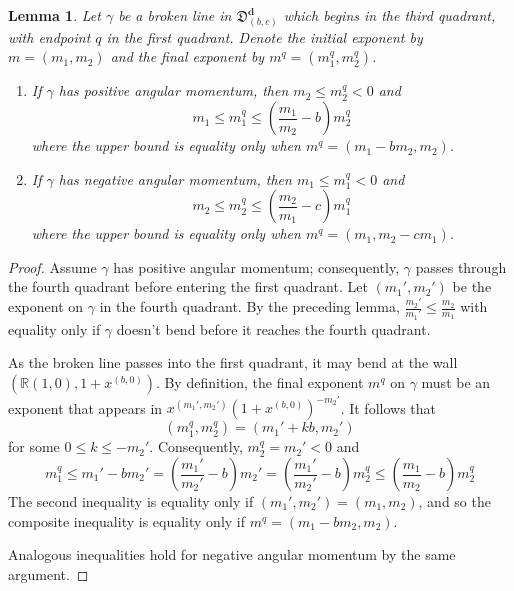 \documentclass[11pt]{amsart}
\newtheorem{lemma}{Lemma}[section]
\theoremstyle{remark}
\numberwithin{equation}{section}
\begin{document}
\begin{lemma}
Let $\gamma$ be a broken line in $\mathfrak{D}_{(b,c)}^{\mathbf{d}}$ which begins in the third quadrant, with endpoint $q$ in the first quadrant.  Denote the  initial exponent by $m=(m_1,m_2)$ and the final exponent by $m^q=(m_1^q,m_2^q)$.  
\begin{enumerate}
  \item If $\gamma$ has positive angular momentum, then $m_2\leq m_2^q<0$ and
  \[ m_1\leq m_1^q\leq\left( \frac{m_1}{m_2}-b\right)m_2^q\]
  where the upper bound is equality only when $m^q =( m_1-bm_2,m_2)$.
  \item If $\gamma$ has negative angular momentum, then $m_1\leq  m_1^q<0$ and
  \[ m_2 \leq m_2^q\leq\left( \frac{m_2}{m_1}-c\right)m_1^q\]
  where the upper bound is equality only when $m^q =( m_1,m_2-cm_1)$.
\end{enumerate}
\end{lemma}
\begin{proof}
Assume $\gamma$ has positive angular momentum; consequently, $\gamma$ passes through the fourth quadrant before entering the first quadrant.  Let $(m_1',m_2')$ be the exponent on $\gamma$ in the fourth quadrant.  By the preceding lemma, $\frac{m_2'}{m_1'}\leq \frac{m_2}{m_1}$ with equality only if $\gamma$ doesn't bend before it reaches the fourth quadrant.  

As the broken line passes into the first quadrant, it may bend at the wall $(\mathbb{R}(1,0),1+x^{(b,0)})$.  By definition, the final exponent $m^q$ on $\gamma$ must be an exponent that appears in $x^{(m_1',m_2')}(1+x^{(b,0)})^{-m_2'}$.  It follows that%
\[ (m_1^q,m_2^q) = (m_1'+kb,m_2')\]
for some $0\leq k\leq -m_2'$.
Consequently, $m_2^q=m_2'<0$ and 
\[ m_1^q\leq m_1' - bm_2' = \left(\frac{m_1'}{m_2'} - b\right) m_2'  = \left(\frac{m_1'}{m_2'} - b\right) m_2^q \leq \left(\frac{m_1}{m_2} - b\right) m_2^q\]
The second inequality is equality only if $(m_1',m_2')=(m_1,m_2)$, and so the composite inequality is equality only if $m^q =( m_1-bm_2,m_2)$.

Analogous inequalities hold for negative angular momentum by the same argument.
\end{proof}
\end{document}
